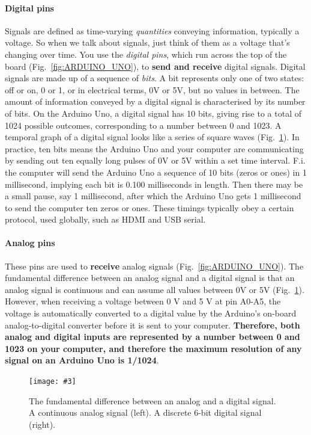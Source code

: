 \documentclass[10pt,twoside,openright]{article}
\newcommand{\mijnfiguur}[5][ht]{            %
    \begin{figure}[#1]                      %
        \begin{center}                      %
            \texttt{[image: \#3]}        %
        \end{center}
        \caption{#4\label{#5}}          %
    \end{figure}
    }
\begin{document}
\paragraph{Digital pins} Signals are defined as time-varying \textit{quantities} conveying information, typically a voltage. So when we talk about signals, just think of them as a voltage that's changing over time. You use the \textit{digital pins}, which run across the top of the board (Fig.~\ref{fig:ARDUINO_UNO}), to \textbf{send and receive} digital signals. Digital signals are made up of a sequence of \textit{bits}. A bit represents only one of two states: off or on, 0 or 1, or in electrical terms, 0V or 5V, but no values in between. The amount of information conveyed by a digital signal is characterised by its number of bits. On the Arduino Uno, a digital signal has 10 bits, giving rise to a total of 1024 possible outcomes, corresponding to a number between 0 and 1023. A temporal graph of a digital signal looks like a series of square waves (Fig.~\ref{fig:signals}). In practice, ten bits means the Arduino Uno and your computer are communicating by sending out ten equally long pulses of 0V or 5V within a set time interval. F.i. the computer will send the Arduino Uno a sequence of 10 bits (zeros or ones) in 1 millisecond, implying each bit is 0.100 milliseconds in length. Then there may be a small pause, say 1 millisecond, after which the Arduino Uno gets 1 millisecond to send the computer ten zeros or ones. These timings typically obey a certain protocol, used globally, such as HDMI and USB serial.

\paragraph{Analog pins} These pins are used to \textbf{receive} analog signals (Fig.~\ref{fig:ARDUINO_UNO}). The fundamental difference between an analog signal and a digital signal is that an analog signal is continuous and can assume all values between 0V or 5V (Fig.~\ref{fig:signals}). However, when receiving a voltage between 0 V and 5 V at pin A0-A5, the voltage is automatically converted to a digital value by the Arduino's on-board analog-to-digital converter before it is sent to your computer. \textbf{Therefore, both analog and digital inputs are represented by a number between 0 and 1023 on your computer, and therefore the maximum resolution of any signal on an Arduino Uno is 1/1024}.

\mijnfiguur[h!]{width=9cm}{analog_digital_signal.pdf}{The fundamental difference between an analog and a digital signal. A continuous analog signal (left). A discrete 6-bit digital signal (right).}{fig:signals}
\end{document}
